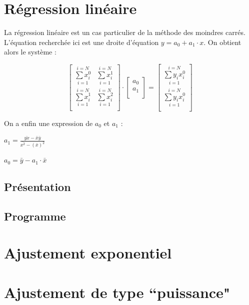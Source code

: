 \documentclass{report}
\begin{document}
    \section{Régression linéaire}
    La régression linéaire est un cas particulier de la méthode des moindres carrés. L'équation recherchée ici est une droite d'équation $y=a_{0} + a_{1} \cdot x$. On obtient alors le système :
    
    \begin{equation}
    \begin{bmatrix}
    \overset{i=N}{\underset{i=1}{\sum x_{i}^{0}}} & \overset{i=N}{\underset{i=1}{\sum x_{i}^{1}}} \\
    \overset{i=N}{\underset{i=1}{\sum x_{i}^{1}}} & \overset{i=N}{\underset{i=1}{\sum x_{i}^{2}}} \\
    \end{bmatrix}
    \cdot
    \begin{bmatrix}
    a_{0} \\
    a_{1} \\
    \end{bmatrix}
    =
    \begin{bmatrix}
    \overset{i=N}{\underset{i=1}{\sum y_{i} x_{i}^{0}}} \\
    \overset{i=N}{\underset{i=1}{\sum y_{i} x_{i}^{0}}} \\
    \end{bmatrix}
    \end{equation}
    
    On a enfin une expression de $a_{0}$ et $a_{1}$ :
    
    $a_{1} = \frac{\bar{yx}-\bar{x}\bar{y}}{\bar{x^{2}}-(\bar{x})^2}$
    
    \vspace{0.1 cm}
    $a_{0} = \bar{y} - a_{1} \cdot \bar{x}$
      \subsection{Présentation}
      \subsection{Programme}
	
    \section{Ajustement exponentiel}
    
    \section{Ajustement de type ``puissance"}
    \newpage
\end{document}
